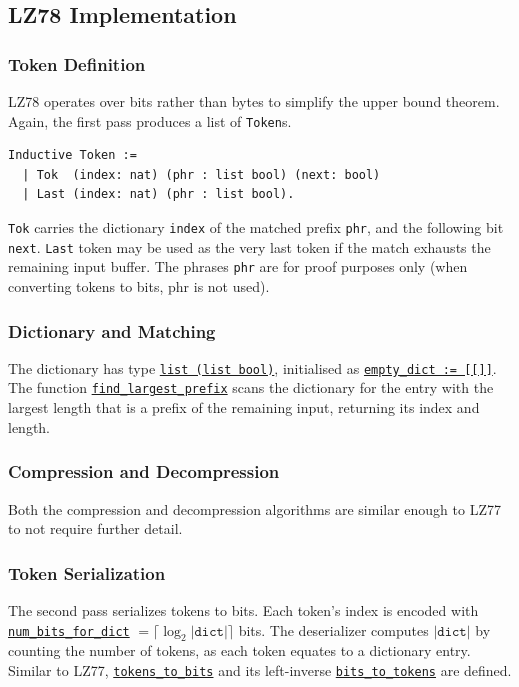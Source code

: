 \documentclass[
  a4paper, twocolumn, DIV=calc]{scrartcl}
\begin{document}
\subsection{LZ78 Implementation}
\subsubsection{Token Definition}
LZ78 operates over bits rather than bytes to simplify the upper bound theorem.
Again, the first pass produces a list of \texttt{Token}s.
\begin{verbatim}
Inductive Token :=
  | Tok  (index: nat) (phr : list bool) (next: bool)
  | Last (index: nat) (phr : list bool). 
\end{verbatim}
\texttt{Tok} carries the dictionary \texttt{index} of the matched prefix \texttt{phr},
and the following bit \texttt{next}. \texttt{Last} token may be used as the very
last token if the match exhausts the remaining input buffer. The phrases
\texttt{phr} are for proof purposes only (when converting tokens to bits, phr is not used).

\subsubsection{Dictionary and Matching}
The dictionary has type
\href{https://github.com/Jatana/LZ78FormalVerification/blob/2819b54b6eb88639461c4fd3504fbc2a87e8cbc0/lz78/LZ_Dict.v#L7}{\texttt{list (list bool)}},
initialised as
\href{https://github.com/Jatana/LZ78FormalVerification/blob/2819b54b6eb88639461c4fd3504fbc2a87e8cbc0/lz78/LZ_Dict.v#L8}{\texttt{empty\_dict := [[]]}}.
The function
\href{https://github.com/Jatana/LZ78FormalVerification/blob/2819b54b6eb88639461c4fd3504fbc2a87e8cbc0/lz78/LZ_Dict.v#L31}{\texttt{find\_largest\_prefix}}
scans the dictionary for the entry with the largest length that is a prefix of the
remaining input, returning its index and length.

\subsubsection{Compression and Decompression}
Both the compression and decompression algorithms are similar enough to LZ77 to
not require further detail.

\subsubsection{Token Serialization}
The second pass serializes tokens to bits. Each token's index is encoded with
\href{https://github.com/Jatana/LZ78FormalVerification/blob/2819b54b6eb88639461c4fd3504fbc2a87e8cbc0/lz78/LZ_Dict.v#L10}{\texttt{num\_bits\_for\_dict}} 
$ = \lceil \log_2|\texttt{dict}| \rceil$ bits.
The deserializer computes $|\texttt{dict}|$ by counting the number of tokens, as
each token equates to a dictionary entry.
Similar to LZ77, \href{https://github.com/Jatana/LZ78FormalVerification/blob/2819b54b6eb88639461c4fd3504fbc2a87e8cbc0/lz78/LZ_Tokens.v#L83}{\texttt{tokens\_to\_bits}}
and its left-inverse \href{https://github.com/Jatana/LZ78FormalVerification/blob/2819b54b6eb88639461c4fd3504fbc2a87e8cbc0/lz78/LZ_Tokens.v#L103}{\texttt{bits\_to\_tokens}}
are defined.
\end{document}
